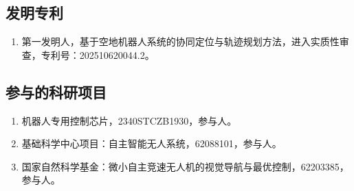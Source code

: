 \cleardoublepage
{}

\subsection*{发明专利}

\begin{enumerate}[label=\arabic*., leftmargin=*, labelsep=0.5em]
    \item 第一发明人，基于空地机器人系统的协同定位与轨迹规划方法，进入实质性审查，专利号：202510620044.2。
\end{enumerate}

\subsection*{参与的科研项目}

\begin{enumerate}[label=\arabic*., leftmargin=*, itemsep=0.8em]
    \item 机器人专用控制芯片，2340STCZB1930，参与人。
    \item 基础科学中心项目：自主智能无人系统，62088101，参与人。
    \item 国家自然科学基金：微小自主竞速无人机的视觉导航与最优控制，62203385，参与人。
\end{enumerate}
